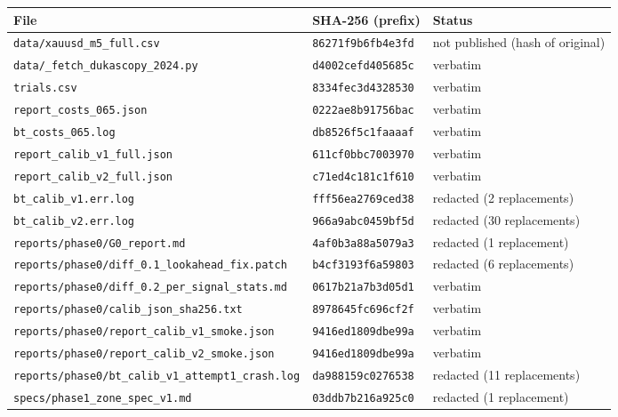 {\scriptsize
\begin{longtable}{@{}>{\raggedright\arraybackslash}p{8.6cm}p{2.7cm}>{\raggedright\arraybackslash}p{3.4cm}@{}}
\toprule
File & SHA-256 (prefix) & Status \\
\midrule
\endhead
\texttt{data/\allowbreak{}xauusd\_m5\_full.csv} & \texttt{86271f9b6fb4e3fd} & not published (hash of original) \\
\texttt{data/\allowbreak{}\_fetch\_dukascopy\_2024.py} & \texttt{d4002cefd405685c} & verbatim \\
\texttt{trials.csv} & \texttt{8334fec3d4328530} & verbatim \\
\texttt{report\_costs\_065.json} & \texttt{0222ae8b91756bac} & verbatim \\
\texttt{bt\_costs\_065.log} & \texttt{db8526f5c1faaaaf} & verbatim \\
\texttt{report\_calib\_v1\_full.json} & \texttt{611cf0bbc7003970} & verbatim \\
\texttt{report\_calib\_v2\_full.json} & \texttt{c71ed4c181c1f610} & verbatim \\
\texttt{bt\_calib\_v1.err.log} & \texttt{fff56ea2769ced38} & redacted (2 replacements) \\
\texttt{bt\_calib\_v2.err.log} & \texttt{966a9abc0459bf5d} & redacted (30 replacements) \\
\texttt{reports/\allowbreak{}phase0/\allowbreak{}G0\_report.md} & \texttt{4af0b3a88a5079a3} & redacted (1 replacement) \\
\texttt{reports/\allowbreak{}phase0/\allowbreak{}diff\_0.1\_lookahead\_fix.patch} & \texttt{b4cf3193f6a59803} & redacted (6 replacements) \\
\texttt{reports/\allowbreak{}phase0/\allowbreak{}diff\_0.2\_per\_signal\_stats.md} & \texttt{0617b21a7b3d05d1} & verbatim \\
\texttt{reports/\allowbreak{}phase0/\allowbreak{}calib\_json\_sha256.txt} & \texttt{8978645fc696cf2f} & verbatim \\
\texttt{reports/\allowbreak{}phase0/\allowbreak{}report\_calib\_v1\_smoke.json} & \texttt{9416ed1809dbe99a} & verbatim \\
\texttt{reports/\allowbreak{}phase0/\allowbreak{}report\_calib\_v2\_smoke.json} & \texttt{9416ed1809dbe99a} & verbatim \\
\texttt{reports/\allowbreak{}phase0/\allowbreak{}bt\_calib\_v1\_attempt1\_crash.log} & \texttt{da988159c0276538} & redacted (11 replacements) \\
\texttt{specs/\allowbreak{}phase1\_zone\_spec\_v1.md} & \texttt{03ddb7b216a925c0} & redacted (1 replacement) \\

\end{longtable}}
